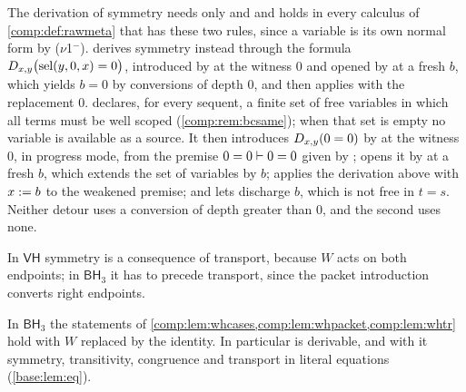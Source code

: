 \begin{remark}
\label{comp:rem:bhsym}
The derivation of symmetry needs only  and 
and holds in every calculus of \cref{comp:def:rawmeta} that has these two
rules, since a variable is its own normal form by ($\nu$1$^{-}$).
 derives symmetry instead through the formula
$D_{x,y}\bigl(\operatorname{sel}(y,0,x)=0\bigr)$, introduced by  at the
witness $0$ and opened by  at a fresh $b$, which yields $b=0$ by
conversions of depth $0$, and then applies  with the
replacement $0$.  declares, for every sequent, a
finite set of free variables in which all terms must be well scoped
(\cref{comp:rem:bcsame}); when that set is empty no variable is available
as a source. It then introduces $D_{x,y}(0=0)$ by  at the
witness $0$, in progress mode, from the premise $0=0\vdash0=0$ given by
; opens it by  at a fresh $b$, which extends the
set of variables by $b$; applies the derivation above with $x\mathrel{:=} b$ to the
weakened premise; and lets  discharge $b$, which is not free in
$t=s$. Neither detour uses a conversion of depth greater than $0$, and the
second uses none.
\end{remark}

In $\mathsf{VH}$ symmetry is a consequence of transport, because $W$ acts on
both endpoints; in $\mathsf{BH}_3$ it has to precede transport, since the
packet introduction converts right endpoints.

\begin{lemma}
\label{comp:lem:bhtr}
In $\mathsf{BH}_3$ the statements of
\cref{comp:lem:whcases,comp:lem:whpacket,comp:lem:whtr} hold with $W$
replaced by the identity. In particular  is derivable, and with
it symmetry, transitivity, congruence and transport in literal equations
(\cref{base:lem:eq}).
\end{lemma}

